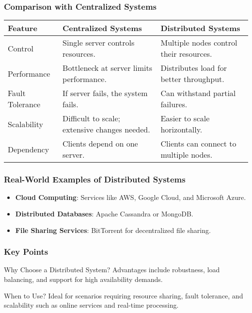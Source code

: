 \documentclass[aspectratio=169]{beamer}
\begin{document}
\begin{frame}[fragile]
    \frametitle{Comparison with Centralized Systems}
    \begin{table}[ht]
        \centering
        \begin{tabular}{|l|l|l|}
            \hline
            \textbf{Feature} & \textbf{Centralized Systems} & \textbf{Distributed Systems} \\ \hline
            Control & Single server controls resources. & Multiple nodes control their resources. \\ \hline
            Performance & Bottleneck at server limits performance. & Distributes load for better throughput. \\ \hline
            Fault Tolerance & If server fails, the system fails. & Can withstand partial failures. \\ \hline
            Scalability & Difficult to scale; extensive changes needed. & Easier to scale horizontally. \\ \hline
            Dependency & Clients depend on one server. & Clients can connect to multiple nodes. \\ \hline
        \end{tabular}
    \end{table}
\end{frame}

\begin{frame}[fragile]
    \frametitle{Real-World Examples of Distributed Systems}
    \begin{itemize}
        \item \textbf{Cloud Computing}: Services like AWS, Google Cloud, and Microsoft Azure.
        \item \textbf{Distributed Databases}: Apache Cassandra or MongoDB.
        \item \textbf{File Sharing Services}: BitTorrent for decentralized file sharing.
    \end{itemize}
\end{frame}

\begin{frame}[fragile]
    \frametitle{Key Points}
    \begin{block}{Why Choose a Distributed System?}
        Advantages include robustness, load balancing, and support for high availability demands.
    \end{block}
    \begin{block}{When to Use?}
        Ideal for scenarios requiring resource sharing, fault tolerance, and scalability such as online services and real-time processing.
    \end{block}
\end{frame}
\end{document}
